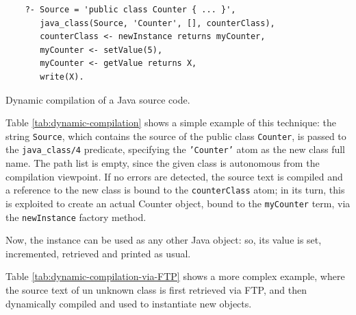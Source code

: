 \begin{table}
\begin{verbatim}
    ?- Source = 'public class Counter { ... }',
       java_class(Source, 'Counter', [], counterClass),
       counterClass <- newInstance returns myCounter,
       myCounter <- setValue(5),
       myCounter <- getValue returns X,
       write(X).
\end{verbatim}
\caption{Dynamic compilation of a Java source code.}
\label{tab:dynamic-compilation}
\end{table}

Table \ref{tab:dynamic-compilation} shows a simple example of this technique: the string \texttt{Source}, which contains the source of the public class \texttt{Counter}, is passed to the \texttt{java\_class/4} predicate, specifying the \texttt{'Counter'} atom as the new class full name. The path list is empty, since the given class is autonomous from the compilation viewpoint.
%
If no errors are detected, the source text is compiled and a reference to the new class is bound to the \texttt{counterClass} atom; in its turn, this is exploited to create an actual Counter object, bound to the \texttt{myCounter} term, via the \texttt{newInstance} factory method.

Now, the instance can be used as any other Java object: so, its value is set, incremented, retrieved and printed as usual.

Table \ref{tab:dynamic-compilation-via-FTP} shows a more complex example, where the source text of un unknown class is first retrieved via FTP, and then dynamically compiled and used to instantiate new objects.

